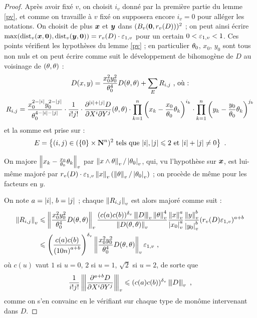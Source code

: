 \begin{proof}
  Après avoir fixé $v$, on choisit $i_v$ donné par la première partie du lemme
  \ref{pv}, et comme on travaille à $v$ fixé on supposera encore $i_v = 0$
  pour alléger les notations. On choisit de plus ${\boldsymbol{x}}$ et ${\boldsymbol{y}}$ dans
  $(B_v({\boldsymbol{0}}, r_v(D)))^2$ ; on peut ainsi écrire $\max(\mathrm{dist}_v({\boldsymbol{x}}, {\boldsymbol{0}}), \mathrm{dist}_v({\boldsymbol{y}}, {\boldsymbol{0}})) = r_v(D)\cdot\varepsilon_{1, v}$ pour un certain $0 < \varepsilon_{1, v} < 1$.
  Ces points vérifient  les hypothèses du lemme \ref{pv} ; en
  particulier $\theta_0$, $x_0$, $y_0$ sont tous non nuls et on peut écrire
  comme suit le développement de  bihomogène de $D$ au voisinage
  de $(\theta, \theta)$ :
  \[
  D(x, y) = \frac{x_0^2y_0^2}{\theta_0^4}D(\theta, \theta) + \sum_E R_{i, j}
  \text{ , où :}
  \]
  \[
  R_{i, j} =
  \frac{x_0^{2-{|i|}}y_0^{2-{|j|}}}{\theta_0^{4-{|i|}-{|j|}}}\cdot
  \frac{1}{i!j!} \cdot
  \frac{\partial^{{|i|}+{|j|}}D}{\partial X^i \partial Y^j}(\theta, \theta)
  \cdot
  \prod_{k=1}^n \left( x_{k} - \frac{x_0}{\theta_0} \theta_{k} \right)^{i_k}
  \cdot \prod_{k=1}^n \left( y_{k} - \frac{y_0}{\theta_0} \theta_{k}
  \right)^{j_k}
  \]
  et la somme est prise sur :
  \[
  E = \left\{ (i, j) \in (\{0\} \times \mathbf{N}^n)^2 \text{ tels que }
    {|i|},{|j|} \leqslant 2 \text{ et } {|i|}+{|j|} \neq 0 \right\}
  \text{ .}
  \]

  On majore $\left\lVert x_k - \frac{x_0}{\theta_0} \theta_k\right\rVert_{v}$ par $\left\lVert x \wedge
  \theta\right\rVert_{v}/\left\lvert\theta_0\right\rvert_{v}$, qui, vu l'hypothèse sur ${\boldsymbol{x}}$, est lui-même majoré
  par $r_v(D)\cdot\varepsilon_{1, v} \left\lVert x\right\rVert_{v} (\left\lVert\theta\right\rVert_{v}/\left\lvert\theta_0\right\rvert_{v})$ ; on procède de
  même pour les facteurs en $y$.

  On note $a = {|i|}$, $b={|j|}$ ; chaque $\left\lVert R_{i, j}\right\rVert_{v}$ est alors majoré
  comme suit :
  \begin{align*}
  \left\lVert R_{i, j}\right\rVert_{v} & \leqslant
  \left\lVert\frac{x_0^2y_0^2}{\theta_0^4}D(\theta, \theta)\right\rVert_{v}
  \frac{(c(a)c(b))^{\delta_v} \left\lvert\hspace{-1pt} \left\lvert\hspace{-1pt} \left\lvert D\right\rvert \hspace{-1pt}\right\rvert \hspace{-1pt}\right\rvert_{v}\left\lVert\theta\right\rVert_{v}^4}{\left\lVert D(\theta, \theta)\right\rVert_{v}}
  \frac{\left\lVert x\right\rVert_{v}^a}{\left\lvert x_0\right\rvert_{v}^a} \frac{\left\lVert y\right\rVert_{v}^b}{\left\lvert y_0\right\rvert_{v}^b} (r_v(D)\varepsilon_{1,
    v})^{a+b}\\
  & \leqslant \left( \frac{c(a)c(b)}{\left( 10n \right)^{a+b}} \right)^{\delta_v}
  \left\lVert\frac{x_0^2y_0^2}{\theta_0^4}D(\theta, \theta)\right\rVert_{v} \varepsilon_{1, v} \text{ ,}
  \end{align*}
  où $c(u)$ vaut $1$ si $u=0$, $2$ si $u=1$, $\sqrt{2}$ si $u=2$, de sorte que
  \[
  \frac{1}{i!j!}\left\lvert\hspace{-1pt} \left\lvert\hspace{-1pt} \left\lvert\frac{\partial^{a+b}D}{\partial X^i \partial Y^j}\right\rvert \hspace{-1pt}\right\rvert \hspace{-1pt}\right\rvert_{v} \leqslant
  (c(a) c(b))^{\delta_v} \left\lvert\hspace{-1pt} \left\lvert\hspace{-1pt} \left\lvert D\right\rvert \hspace{-1pt}\right\rvert \hspace{-1pt}\right\rvert_{v}\text{ ,}
  \]
  comme on s'en convainc en le vérifiant sur chaque type de monôme intervenant
  dans $D$.


\end{proof}
